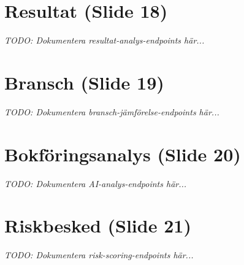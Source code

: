 \documentclass[12pt,a4paper]{article}
\begin{document}

\section{Resultat (Slide 18)}

\textit{TODO: Dokumentera resultat-analys-endpoints här...}

\newpage


\section{Bransch (Slide 19)}

\textit{TODO: Dokumentera bransch-jämförelse-endpoints här...}

\newpage


\section{Bokföringsanalys (Slide 20)}

\textit{TODO: Dokumentera AI-analys-endpoints här...}

\newpage


\section{Riskbesked (Slide 21)}

\textit{TODO: Dokumentera risk-scoring-endpoints här...}

\newpage

\end{document}
